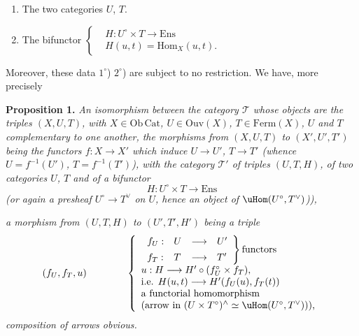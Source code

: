\begin{enumerate}[label={}]
\item[$1^\circ$)] The two categories $U$, $T$.
\item[$2^\circ$)] The bifunctor $\displaystyle\left\{\begin{aligned}
&H : U^\circ \times T \longrightarrow \mathrm{Ens}\\[1ex]
&H(u,t) = \mathrm{Hom}_X(u,t).
\end{aligned}\right.$
\end{enumerate}

Moreover, these data $1^\circ$) $2^\circ$) are subject to no restriction. We have, more precisely %

\textbf{Proposition 1.} \textit{An isomorphism} \textit{between the category $\mathcal{T}$ whose objects are the triples $(X,U,T)$, with $X \in \mathrm{Ob}\,\mathrm{Cat}$, $U \in \mathrm{Ouv}(X)$, $T \in \mathrm{Ferm}(X)$, $U$ and $T$ complementary to one another, the morphisms from $(X,U,T)$ to $(X',U',T')$ being the functors $f : X \longrightarrow X'$ which induce $U \longrightarrow U'$, $T \longrightarrow T'$ (whence
$U = f^{-1}(U')$, $T = f^{-1}(T')$), with the category $\mathcal{T}'$ of triples $(U,T,H)$, of two categories $U$, $T$ and of a bifunctor}
\[
H : U^\circ \times T \longrightarrow \mathrm{Ens}
\]
\hspace*{2em}\textit{(or again a presheaf $U^\circ \longrightarrow T^\vee$ on $U$, hence an object of} $\uHom(U^\circ,T^\vee)$\textit{)),} %

\textit{a morphism from $(U,T,H)$ to $(U',T',H')$ being a triple}
\[
(f_U, f_T, u) \qquad\qquad
\left\{\begin{array}{l}
\left.\begin{array}{llll}
f_U : & U & \longrightarrow & U' \\[1ex]
f_T : & T & \longrightarrow & T'
\end{array}\right\}\text{functors}\\[2ex]
u : H \longrightarrow H' \circ (f_U^\circ \times f_T),\\
\text{i.e. } H(u,t) \longrightarrow H'(f_U(u), f_T(t))\\
\text{a functorial homomorphism}\\
\text{(arrow in } (U \times T^\circ)^\wedge \simeq \uHom(U^\circ,T^\vee)\text{)),}
\end{array}\right.
\]
\textit{composition of arrows obvious.}

